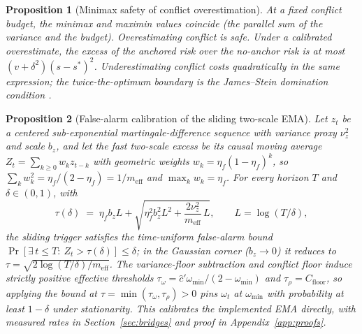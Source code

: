 \documentclass[10pt]{article}
\newtheorem{proposition}{Proposition}
\begin{document}
\begin{proposition}[Minimax safety of conflict overestimation]
\label{prop:minimax}
At a fixed conflict budget, the minimax and maximin values coincide (the parallel sum of the variance and the budget).
Overestimating conflict is safe.
Under a calibrated overestimate, the excess of the anchored risk over the no-anchor risk is at most $(v+\delta^2)(s-s^*)^2$. Underestimating conflict costs quadratically in the same expression; the twice-the-optimum boundary is the James--Stein domination condition \citep{james1961}.
\end{proposition}

\begin{proposition}[False-alarm calibration of the sliding two-scale EMA]
\label{prop:falsealarm}
Let $z_t$ be a centered sub-exponential martingale-difference sequence with variance proxy $\nu_z^2$ and scale $b_z$, and let the fast two-scale excess be its causal moving average $Z_t = \sum_{k\ge 0} w_k z_{t-k}$ with geometric weights $w_k = \eta_f(1-\eta_f)^k$, so $\sum_k w_k^2 = \eta_f/(2-\eta_f) = 1/m_{\mathrm{eff}}$ and $\max_k w_k = \eta_f$.
For every horizon $T$ and $\delta \in (0,1)$, with
\[
\tau(\delta) \;=\; \eta_f b_z L + \sqrt{\eta_f^2 b_z^2 L^2 + \frac{2\nu_z^2}{m_{\mathrm{eff}}}\,L},
\qquad L = \log(T/\delta),
\]
the sliding trigger satisfies the time-uniform false-alarm bound $\Pr[\exists\, t \le T:\ Z_t > \tau(\delta)] \le \delta$; in the Gaussian corner ($b_z \to 0$) it reduces to $\tau = \sqrt{2\log(T/\delta)/m_{\mathrm{eff}}}$.
The variance-floor subtraction and conflict floor induce strictly positive effective thresholds $\tau_\omega = \hat c' \omega_{\min}/(2-\omega_{\min})$ and $\tau_\rho = C_{\mathrm{floor}}$, so applying the bound at $\tau = \min(\tau_\omega,\tau_\rho) > 0$ pins $\omega_t$ at $\omega_{\min}$ with probability at least $1-\delta$ under stationarity.
This calibrates the implemented EMA directly, with measured rates in Section~\ref{sec:bridges} and proof in Appendix~\ref{app:proofs}.
\end{proposition}
\end{document}
